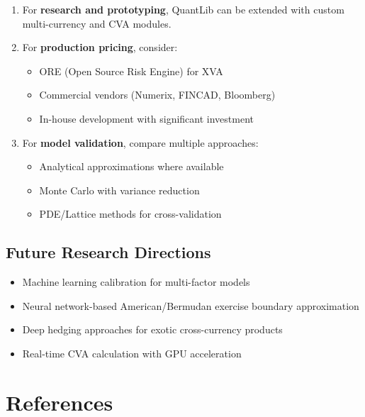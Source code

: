 \documentclass[11pt,a4paper]{article}
\theoremstyle{definition}
\begin{document}
\begin{enumerate}
    \item For \textbf{research and prototyping}, QuantLib can be extended with custom multi-currency and CVA modules.

    \item For \textbf{production pricing}, consider:
    \begin{itemize}
        \item ORE (Open Source Risk Engine) for XVA
        \item Commercial vendors (Numerix, FINCAD, Bloomberg)
        \item In-house development with significant investment
    \end{itemize}

    \item For \textbf{model validation}, compare multiple approaches:
    \begin{itemize}
        \item Analytical approximations where available
        \item Monte Carlo with variance reduction
        \item PDE/Lattice methods for cross-validation
    \end{itemize}
\end{enumerate}

\subsection{Future Research Directions}

\begin{itemize}
    \item Machine learning calibration for multi-factor models
    \item Neural network-based American/Bermudan exercise boundary approximation
    \item Deep hedging approaches for exotic cross-currency products
    \item Real-time CVA calculation with GPU acceleration
\end{itemize}

\newpage
\section*{References}
\end{document}
